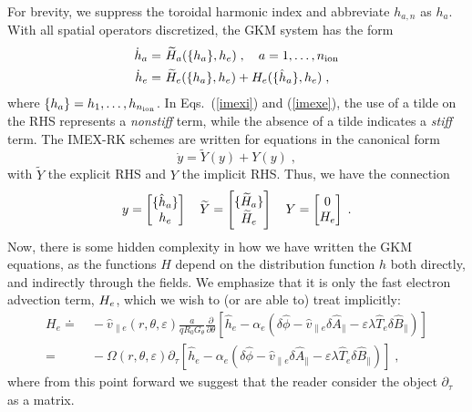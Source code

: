 For brevity, we suppress the toroidal harmonic index and abbreviate $h_{a,n}$ as
$h_a$.  With all spatial operators discretized, the GKM system has the form
%
\begin{align}
{\dot{h}}_a = &~{\widetilde H}_a(\{h_a\},h_e) \; , \quad a = 1, \ldots, n_{\rm ion} 
  \label{imexi} \\
{\dot{h}}_e = &~{\widetilde H}_e(\{h_a\},h_e) + H_e(\{\hat{h}_a\},h_e) \; , 
  \label{imexe}
\end{align}
%
where $\{h_a\} = h_1,\ldots, h_{n_{\rm ion}}$.  In Eqs.~(\ref{imexi}) 
and (\ref{imexe}), the use of a tilde on the RHS represents a {\it nonstiff} 
term, while the absence of a tilde indicates a {\it stiff} term.  The IMEX-RK 
schemes are written for equations in the canonical form
%
\begin{equation}
{\dot y} = {\widetilde Y}(y) + Y(y) \; ,
\end{equation}
%
with ${\widetilde Y}$ the explicit RHS and $Y$ the implicit RHS.
Thus, we have the connection
%
\begin{equation}
y = \begin{bmatrix} \{ \hat{h}_a \} \\ h_e \end{bmatrix} \quad 
{\widetilde Y} = \begin{bmatrix} \{{\widetilde H}_a\} \\ {\widetilde H}_e \end{bmatrix} \quad 
Y = \begin{bmatrix} 0 \\ H_e \end{bmatrix} \; . 
\end{equation}
%
Now, there is some hidden complexity in how we have written 
the GKM equations, as the functions $H$ depend on the distribution 
function $h$ both directly, and indirectly through the fields.
We emphasize that it is only the fast electron advection term, $H_e$, 
which we wish to (or are able to) treat implicitly:
%
\begin{align}
H_{e} \doteq &~-\hat{v}_{\parallel e}(r,\theta,\varepsilon)
\frac{a}{q R_0 G_{\theta}} \frac{\partial}{\partial \theta}
\left[ \hat{h}_e - \alpha_e \left( \delta \hat{\phi} - \hat{v}_{\parallel e} 
\delta \hat{A}_{\parallel} - \varepsilon \lambda \hat{T}_{e} \delta 
\hat{B}_{\parallel} \right) \right] \\
= &~-\Omega(r,\theta,\varepsilon) \partial_\tau
\left[ \hat{h}_{e} - \alpha_e \left( \delta \hat{\phi} 
- \hat{v}_{\parallel e} \delta \hat{A}_{\parallel} 
- \varepsilon \lambda \hat{T}_{e} \delta \hat{B}_{\parallel} \right) \right] \; ,
\end{align}
%
where from this point forward we suggest that the reader consider the 
object $\partial_\tau$ as a matrix.

